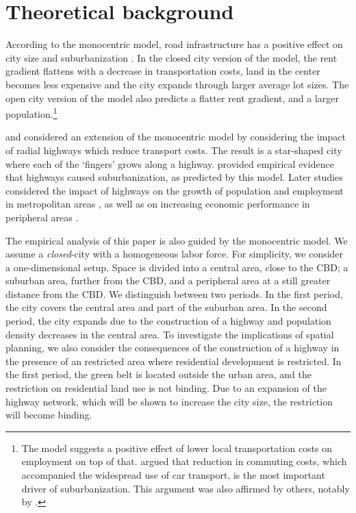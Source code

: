 \documentclass[a4paper,authoryear,review]{elsarticle}  	%
\begin{document}
\section{Theoretical background}	
	According to the monocentric model, road infrastructure has a positive effect on city size and suburbanization \citep{Alonso1964,Muth1969,Mills1967a}. In the closed city version of the model, the rent gradient flattens with a decrease in transportation costs, land in the center becomes less expensive and the city expands through larger average lot sizes. The open city version of the model also predicts a flatter rent gradient, and a larger population.\footnote{The \citet{Roback1982} model suggests a positive effect of lower local transportation costs on employment on top of that. \citet{Glaeser2004} argued that reduction in commuting costs, which accompanied the widespread use of car transport, is the most important driver of suburbanization. This argument was also affirmed by others, notably by \citet{Burchfield2006x}.}
	
	\citet{Anas1979} and \citet{Baum-Snow2007a} considered an extension of the monocentric model by considering the impact of radial highways which reduce transport costs. The result is a star-shaped city where each of the ‘fingers’ grows along a highway. \citet{Baum-Snow2007} provided empirical evidence that highways caused suburbanization, as predicted by this model. Later studies considered the impact of highways on the growth of population and employment in metropolitan areas , as well as on increasing economic performance in peripheral areas \citep{Banerjee2012,Chandra2000,Michaels2008}.
	
	The empirical analysis of this paper is also guided by the monocentric model. We assume a \textit{closed}-city with a homogeneous labor force. For simplicity, we consider a one-dimensional setup. Space is divided into a central area, close to the CBD; a suburban area, further from the CBD, and a peripheral area at a still greater distance from the CBD. We distinguish between two periods. In the first period, the city covers the central area and part of the suburban area. In the second period, the city expands due to the construction of a highway and population density decreases in the central area. To investigate the implications of spatial planning, we also consider the consequences of the construction of a highway in the presence of an restricted area where residential development is restricted. In the first period, the green belt is located outside the urban area, and the restriction on residential land use is not binding. Due to an expansion of the highway network, which will be shown to increase the city size, the restriction will become binding.
	
\end{document}
